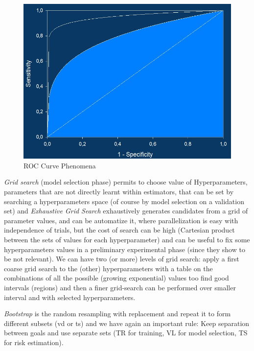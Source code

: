 	\begin{figure}
	    \caption{ROC Curve Phenomena}
	    \label{img:roc}
	    \includegraphics[width=\textwidth]{images/rocCurve}
	\end{figure}

	\emph{Grid search} (model selection phase) permits to choose value of Hyperparameters, parameters that are not directly learnt within estimators, that can be set by searching 
	a hyperparameters space (of course by model selection on a validation set) and \emph{Exhaustive Grid Search} exhaustively generates candidates from a grid of parameter values,
	and can be automatize it, where parallelization is easy with independence of trials, but the cost of search can be high (Cartesian product between the sets of values for each hyperparameter)
	and can be useful to fix some hyperparameters values in a preliminary experimental phase (since they show to be not relevant).\newline
	We can have two (or more) levels of grid search: apply a first coarse grid search to the (other) hyperparameters with a  table on the combinations of all the possible
	(growing exponential) values too find good intervals (regions) and then a finer grid-search can be performed over smaller interval and with selected hyperparameters.

	\emph{Bootstrap} is the random resampling with replacement and repeat it to form different subsets (vd or  ts) and we have again an important rule:
	Keep separation between goals and use separate sets (TR for training, VL for model selection,  TS for risk estimation).


